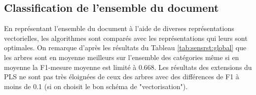%
\subsection{Classification de l'ensemble du document}

En représentant l'ensemble du document à l'aide de diverses représentations vectorielles, les algorithmes sont comparés avec les représentations qui leurs sont optimales. On remarque d'après les résultats du Tableau \ref{tab:sensrst:global} que les arbres sont en moyenne meilleurs sur l'ensemble des catégories même si en moyenne la F1-mesure moyenne est limité à 0.668. Les résultats des extensions du PLS ne sont pas très éloignées de ceux des arbres avec des différences de F1 à moins de 0.1 (si on choisit le bon schéma de "vectorisation").

